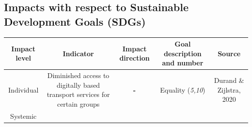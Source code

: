 \documentclass[
]{book}
\begin{document}
\hypertarget{impacts-with-respect-to-sustainable-development-goals-sdgs-3}{%
\subsection*{Impacts with respect to Sustainable Development Goals (SDGs)}\label{impacts-with-respect-to-sustainable-development-goals-sdgs-3}}

\begin{longtable}[]{@{}ccccc@{}}
\toprule
\begin{minipage}[b]{0.17\columnwidth}\centering
Impact level\strut
\end{minipage} & \begin{minipage}[b]{0.16\columnwidth}\centering
Indicator\strut
\end{minipage} & \begin{minipage}[b]{0.17\columnwidth}\centering
Impact direction\strut
\end{minipage} & \begin{minipage}[b]{0.17\columnwidth}\centering
Goal description and number\strut
\end{minipage} & \begin{minipage}[b]{0.17\columnwidth}\centering
Source\strut
\end{minipage}\tabularnewline
\midrule
\endhead
\begin{minipage}[t]{0.17\columnwidth}\centering
Individual\strut
\end{minipage} & \begin{minipage}[t]{0.16\columnwidth}\centering
Diminished access to digitally based transport services for certain groups\strut
\end{minipage} & \begin{minipage}[t]{0.17\columnwidth}\centering
\textbf{-}\strut
\end{minipage} & \begin{minipage}[t]{0.17\columnwidth}\centering
Equality (\emph{5,10})\strut
\end{minipage} & \begin{minipage}[t]{0.17\columnwidth}\centering
Durand \& Zijlstra, 2020\strut
\end{minipage}\tabularnewline
\begin{minipage}[t]{0.17\columnwidth}\centering
Systemic\strut
\end{minipage} & \begin{minipage}[t]{0.16\columnwidth}\centering

\end{minipage}
\end{longtable}
\end{document}
